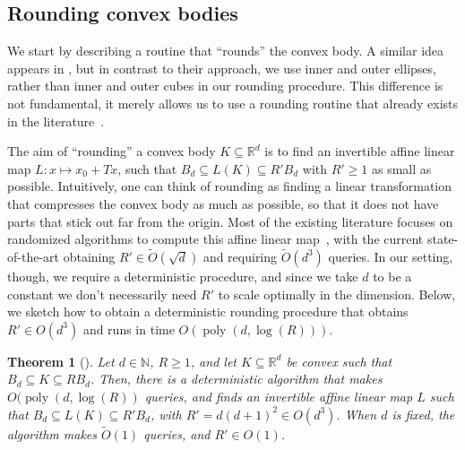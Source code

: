 \documentclass[11pt]{article}
\newtheorem{theorem}{Theorem}[section]
\newcommand{\N}{\ensuremath{\mathbb{N}}}
\newcommand{\R}{\ensuremath{\mathbb{R}}}
\DeclareMathOperator{\poly}{poly}
\begin{document}
    \subsection{Rounding convex bodies}
    \label{subsec:rounding}

    We start by describing a routine that ``rounds'' the convex body. A similar idea appears in \cite{agarwal2004approximating,chan2006faster,yu2008practical}, but in contrast to their approach, we use inner and outer ellipses, rather than inner and outer cubes in our rounding procedure. This difference is not fundamental, it merely allows us to use a rounding routine that already exists in the literature~\cite{grotschel2012geometric}.

    The aim of ``rounding'' a convex body $K \subseteq \R^d$ is to find an invertible affine linear map $L : x \mapsto x_0 + Tx$, such that $B_d \subseteq L(K) \subseteq R'B_d$ with $R' \geq 1$ as small as possible. Intuitively, one can think of rounding as finding a linear transformation that compresses the convex body as much as possible, so that it does not have parts that stick out far from the origin. Most of the existing literature focuses on randomized algorithms to compute this affine linear map~\cite{lovasz2006simulated,jia2021reducing}, with the current state-of-the-art obtaining $R' \in \widetilde{O}(\sqrt{d})$ and requiring $\widetilde{O}(d^3)$ queries. In our setting, though, we require a deterministic procedure, and since we take $d$ to be a constant we don't necessarily need $R'$ to scale optimally in the dimension. Below, we sketch how to obtain a deterministic rounding procedure that obtains $R' \in O(d^3)$ and runs in time $O(\poly(d,\log(R)))$.

    \begin{theorem}[{\cite{grotschel2012geometric}}]
        \label{thm:rounding}
        Let $d \in \N$, $R \geq 1$, and let $K \subseteq \R^d$ be convex such that $B_d \subseteq K \subseteq RB_d$. Then, there is a deterministic algorithm that makes $O(\poly(d,\log(R))$ queries, and finds an invertible affine linear map $L$ such that $B_d \subseteq L(K) \subseteq R'B_d$, with $R' = d(d+1)^2 \in O(d^3)$. When $d$ is fixed, the algorithm makes $\widetilde{O}(1)$ queries, and $R' \in O(1)$.
    \end{theorem}
\end{document}

